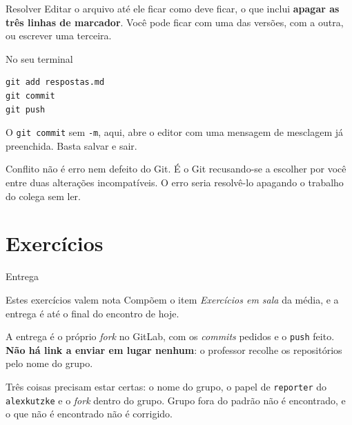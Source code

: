 \documentclass{beamer}
\newenvironment{noterminal}
  {\begin{exampleblock}{No seu terminal}}
  {\end{exampleblock}}
\begin{document}
\begin{frame}[fragile]{Resolver}
  Editar o arquivo até ele ficar como deve ficar, o que inclui \textbf{apagar as
  três linhas de marcador}. Você pode ficar com uma das versões, com a outra, ou
  escrever uma terceira.

  \begin{noterminal}
    \begin{verbatim}
git add respostas.md
git commit
git push
    \end{verbatim}
  \end{noterminal}

  O \texttt{git commit} sem \texttt{-m}, aqui, abre o editor com uma mensagem de
  mesclagem já preenchida. Basta salvar e sair.

  \vspace{0.3cm}
  \begin{block}{}
    Conflito não é erro nem defeito do Git. É o Git recusando-se a escolher por
    você entre duas alterações incompatíveis. O erro seria resolvê-lo apagando o
    trabalho do colega sem ler.
  \end{block}
\end{frame}

\section{Exercícios}

\begin{frame}{Entrega}
  \begin{block}{Estes exercícios valem nota}
    Compõem o item \textit{Exercícios em sala} da média, e a entrega é até o
    final do encontro de hoje.
  \end{block}

  \vspace{0.4cm}
  A entrega é o próprio \textit{fork} no GitLab, com os \textit{commits} pedidos
  e o \texttt{push} feito. \textbf{Não há link a enviar em lugar nenhum}: o
  professor recolhe os repositórios pelo nome do grupo.

  \vspace{0.4cm}
  Três coisas precisam estar certas: o nome do grupo, o papel de
  \texttt{reporter} do \texttt{alexkutzke} e o \textit{fork} dentro do grupo.
  Grupo fora do padrão não é encontrado, e o que não é encontrado não é
  corrigido.
\end{frame}
\end{document}
